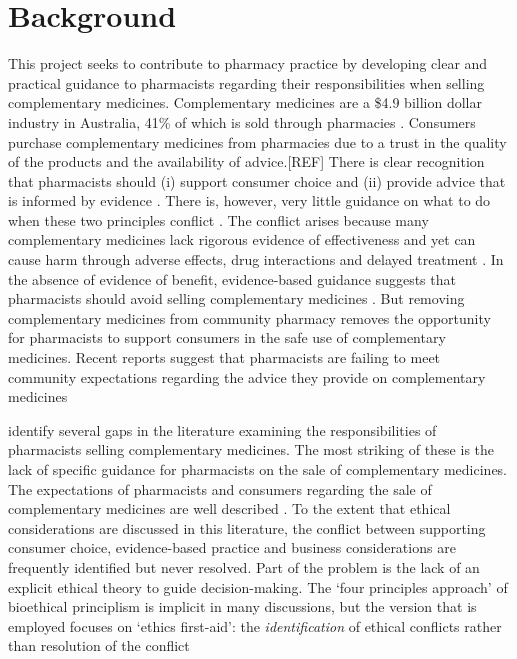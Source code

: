 \documentclass[11pt,a4paper]{article}
\begin{document}
\section{Background}\label{background}

This project seeks to contribute to pharmacy practice by developing
clear and practical guidance to pharmacists regarding their
responsibilities when selling complementary medicines. Complementary
medicines are a \$4.9 billion dollar industry in Australia, 41\% of
which is sold through pharmacies
\autocite{ComplementaryMedicinesAustralia2018}. Consumers purchase
complementary medicines from pharmacies due to a trust in the quality of
the products and the availability of advice.{[}REF{]} There is clear
recognition that pharmacists should (i) support consumer choice and (ii)
provide advice that is informed by evidence
\autocites{InternationalPharmaceuticalFederation2014}{PSA2017}. There
is, however, very little guidance on what to do when these two
principles conflict \autocite{SalmanPopattia2018}. The conflict arises
because many complementary medicines lack rigorous evidence of
effectiveness and yet can cause harm through adverse effects, drug
interactions and delayed treatment \autocites{Myers2004}{Izzo2009}. In
the absence of evidence of benefit, evidence-based guidance suggests
that pharmacists should avoid selling complementary medicines
\autocite{Ernst1996}. But removing complementary medicines from
community pharmacy removes the opportunity for pharmacists to support
consumers in the safe use of complementary medicines. Recent reports
suggest that pharmacists are failing to meet community expectations
regarding the advice they provide on complementary medicines
\autocites{Bray2017}{Thompson2017}{Arnold2016}[.][]{King2017}

\textcite{SalmanPopattia2018} identify several gaps in the literature
examining the responsibilities of pharmacists selling complementary
medicines. The most striking of these is the lack of specific guidance
for pharmacists on the sale of complementary medicines. The expectations
of pharmacists and consumers regarding the sale of complementary
medicines are well described
\autocites{Iyer2016a}{Tran:2013kh}{Kanjanarach2011}. To the extent that
ethical considerations are discussed in this literature, the conflict
between supporting consumer choice, evidence-based practice and business
considerations are frequently identified but never resolved. Part of the
problem is the lack of an explicit ethical theory to guide
decision-making. The `four principles approach' of bioethical
principlism is implicit in many discussions, but the version that is
employed focuses on `ethics first-aid': the \emph{identification} of
ethical conflicts rather than resolution of the conflict
\autocites{Beauchamp2012}{Pullman2005}
\end{document}
